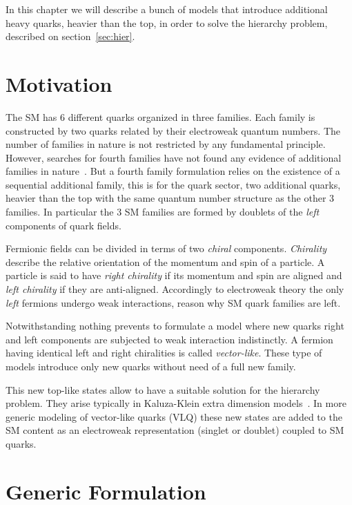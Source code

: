 In this chapter we will describe a bunch of models that introduce additional heavy quarks, heavier than the top, in order to solve the hierarchy problem, described on section~\ref{sec:hier}. 

\section{Motivation}
\label{sec:motiv}

The SM has 6 different quarks organized in three families. Each family is constructed by two quarks related by their electroweak quantum numbers. The number of families in nature is not restricted by any fundamental principle. However, searches for fourth families have not found any evidence of additional families in nature~\cite{Eberhardt:2012gv}. But a fourth family formulation relies on the existence of a sequential additional family, this is for the quark sector, two additional quarks, heavier than the top with the same quantum number structure as the other 3 families. In particular the 3 SM families are formed by doublets of the \textit{left} components of quark fields. 

Fermionic fields can be divided in terms of two \textit{chiral} components. \textit{Chirality} describe the relative orientation of the momentum and spin of a particle. A particle is said to have \textit{right chirality} if its momentum and spin are aligned and \textit{left chirality} if they are anti-aligned.  Accordingly to electroweak theory the only \textit{left} fermions undergo weak interactions, reason why SM quark families are left. 

Notwithstanding nothing prevents to formulate a model where new quarks right and left components are subjected to weak interaction indistinctly. A fermion having identical left and right chiralities is called \textit{vector-like}. These type of models introduce only new quarks without need of a full new family.

This new top-like states allow to have a suitable solution for the hierarchy problem. They arise typically in Kaluza-Klein extra dimension models~\cite{Contino:2006qr, Matsedonskyi:2012ym, Dissertori:2010ug}. In more generic modeling of vector-like quarks (VLQ) these new states are added to the SM content as an electroweak representation (singlet or doublet) coupled to SM quarks.

\section{Generic Formulation}
\label{sec:form}

